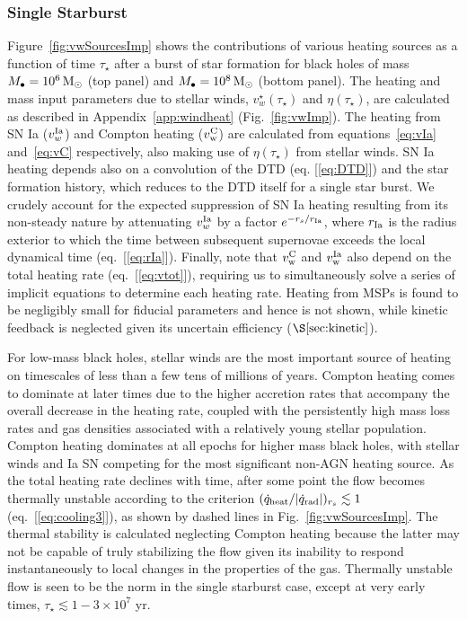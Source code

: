 \documentclass[usenatbib,fleqn]{mn2e}
\newcommand{\rs}{r_s}
\newcommand{\Mbh}[1][]{M_{\bullet#1}}
\newcommand{\rIa}{r_{\rm Ia}}
\begin{document}
\subsubsection{Single Starburst}

Figure~\ref{fig:vwSourcesImp} shows the contributions of various heating sources as a function of time $\tau_{\star}$ after a burst of star formation for black holes of mass $\Mbh = 10^{6} \Msun$ (top panel) and $\Mbh = 10^{8} \Msun$ (bottom panel). The heating and mass input parameters due to stellar winds, $v_{w}^{\star}(\tau_{\star})$ and $\eta(\tau_{\star})$, are calculated as described in Appendix~\ref{app:windheat} (Fig.~\ref{fig:vwImp}).  The heating from SN Ia ($v_{w}^{\rm Ia}$) and Compton heating ($v_{\rm w}^{\rm C}$) are calculated from equations~\eqref{eq:vIa} and~\eqref{eq:vC} respectively, also making use of $\eta(\tau_{\star})$ from stellar winds.  SN Ia heating depends also on a convolution of the DTD (eq. [\ref{eq:DTD}]) and the star formation history, which reduces to the DTD itself for a single star burst.  We crudely account for the expected suppression of SN Ia heating resulting from its non-steady nature by attenuating $v_{w}^{\rm Ia}$ by a factor $e^{-\rs/\rIa}$, where $r_{\rm Ia}$ is the radius exterior to which the time between subsequent supernovae exceeds the local dynamical time (eq.~[\ref{eq:rIa}]).  Finally, note that $v_{\rm w}^{\rm C}$ and $v_{\rm w}^{\rm Ia}$ also depend on the total heating rate (eq.~[\ref{eq:vtot}]), requiring us to simultaneously solve a series of implicit equations to determine each heating rate.  Heating from MSPs is found to be negligibly small for fiducial parameters and hence is not shown, while kinetic feedback is neglected given its uncertain efficiency ($\S\ref{sec:kinetic}$).  

For low-mass black holes, stellar winds are the most important source of heating on
timescales of less than a few tens of millions of years.  Compton
heating comes to dominate at later times due to the higher accretion
rates that accompany the overall decrease in the heating rate, coupled
with the persistently high mass loss rates and gas densities associated with a relatively young
stellar population.  Compton heating dominates at all epochs for
higher mass black holes, with stellar winds and Ia SN competing for
the most significant non-AGN heating source.  As the total heating
rate declines with time, after some point the flow becomes thermally
unstable according to the criterion $(\dot{q}_{\rm heat}/|\dot{q}_{\rm
  rad}|)_{r_{s}} \lesssim 1$ (eq.~[\ref{eq:cooling3}]), as shown by
dashed lines in Fig.~\ref{fig:vwSourcesImp}.  The thermal stability is
calculated neglecting Compton heating because the latter may not be
capable of truly stabilizing the flow given its inability to respond
instantaneously to local changes in the properties of the gas.
Thermally unstable flow is seen to be the norm in the single starburst
case, except at very early times, $\tau_{\star} \lesssim 1-3 \times
10^7$ yr.
\end{document}
